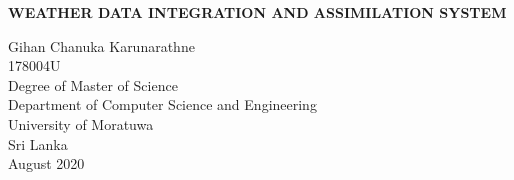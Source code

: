 \documentclass[a4paper,oneside,12pt]{report}
\begin{document}
\begin{titlepage}
    \begin{center}
        \Large{
        \textbf{WEATHER DATA INTEGRATION AND ASSIMILATION SYSTEM}}\\
        \vspace{144pt}
  \large      
       
        
        
        Gihan Chanuka Karunarathne\\
        \vspace{24pt}
      178004U\\
         \vspace{72pt}
        Degree of Master of Science\\
       
        
       \vspace{72pt}
        \large
        Department of Computer Science and Engineering\\
        \vspace{24pt}
        University of Moratuwa\\
        Sri Lanka\\
        \vspace{32pt}
        August 2020
        
    \end{center}
\end{titlepage}
\end{document}
